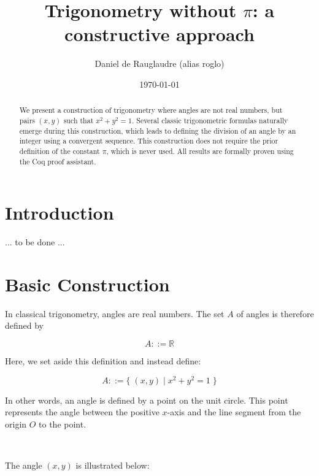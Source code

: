 \documentclass[11pt]{article}
\title{Trigonometry without $\pi$: a constructive approach}
\author{Daniel de Rauglaudre (alias roglo)}
\date{\today}
\begin{document}
\maketitle

\begin{abstract}
We present a construction of trigonometry where angles are not real
numbers, but pairs $(x,y)$ such that $x^2 + y^2 = 1$. Several classic
trigonometric formulas naturally emerge during this construction,
which leads to defining the division of an angle by an integer using a
convergent sequence. This construction does not require the prior
definition of the constant $\pi$, which is never used. All results are
formally proven using the Coq proof assistant.
\end{abstract}

\section{Introduction}

... to be done ...

\section{Basic Construction}

In classical trigonometry, angles are real numbers. The set \( A \) of
angles is therefore defined by

\[
A ::= \mathbb{R}
\]

\noindent Here, we set aside this definition and instead define:

\[
A ::= \{ \; (x, y) \; | \; x^2 + y^2 = 1 \; \}
\]

\noindent In other words, an angle is defined by a point on the unit
circle. This point represents the angle between the positive \( x
\)-axis and the line segment from the origin \( O \) to the point.

\

\noindent The angle \( (x, y) \) is illustrated below:

\

\end{document}
